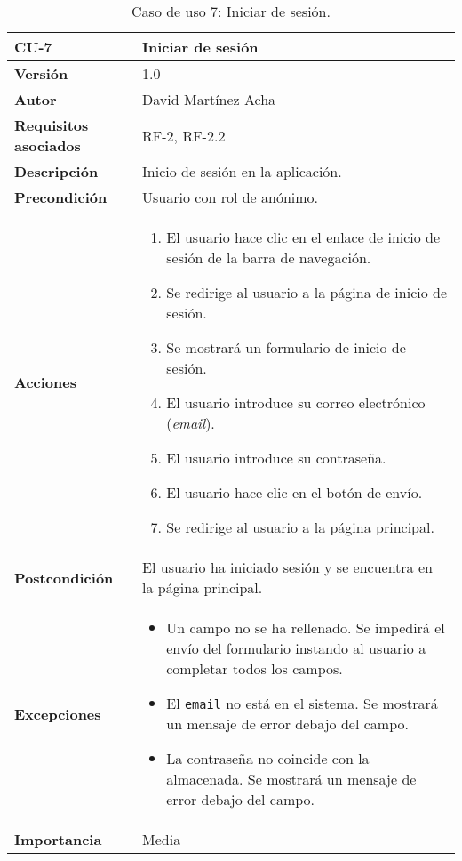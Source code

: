 \begin{table}[p]
	\centering
	\begin{tabularx}{\linewidth}{ p{} p{} }
		\toprule
		\textbf{CU-7}    & \textbf{Iniciar de sesión}\\
		\toprule
		\textbf{Versión}              & 1.0    \\
		\textbf{Autor}                & David Martínez Acha \\
		\textbf{Requisitos asociados} & RF-2, RF-2.2 \\
		\textbf{Descripción}          & Inicio de sesión en la aplicación. \\
		\textbf{Precondición}         & Usuario con rol de anónimo. \\
		\textbf{Acciones}             &
		\begin{enumerate}
			\def\labelenumi{\arabic{enumi}.}
			\tightlist
			\item El usuario hace clic en el enlace de inicio de sesión de la barra de navegación.
			\item Se redirige al usuario a la página de inicio de sesión.
			\item Se mostrará un formulario de inicio de sesión.
			\item El usuario introduce su correo electrónico (\textit{email}).
			\item El usuario introduce su contraseña.
            \item El usuario hace clic en el botón de envío.
			\item Se redirige al usuario a la página principal.
		\end{enumerate}\\
		\textbf{Postcondición}        & El usuario ha iniciado sesión y se encuentra en la página principal. \\
		\textbf{Excepciones}          & \begin{itemize}
			\item Un campo no se ha rellenado. Se impedirá el envío del formulario instando al usuario a completar todos los campos.
			\item El \texttt{email} no está en el sistema. Se mostrará un mensaje de error debajo del campo.
			\item La contraseña no coincide con la almacenada. Se mostrará un mensaje de error debajo del campo.
		\end{itemize}\\
		\textbf{Importancia}          & Media \\
		\bottomrule
	\end{tabularx}
	\caption{Caso de uso 7: Iniciar de sesión.}
\end{table}

